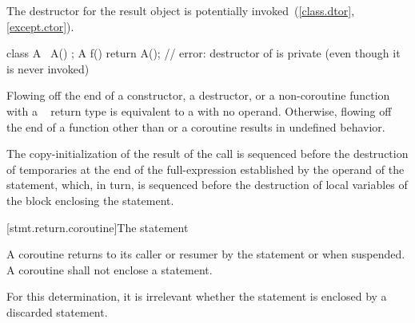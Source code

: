\pnum
The destructor for the result object
is potentially invoked~(\ref{class.dtor}, \ref{except.ctor}).
\begin{example}
\begin{codeblock}
class A {
  ~A() {}
};
A f() { return A(); }   // error: destructor of  is private (even though it is never invoked)
\end{codeblock}
\end{example}

\pnum
Flowing off the end of
a constructor,
a destructor, or
a non-coroutine function with a \cv{}~ return type is
equivalent to a  with no operand.
Otherwise, flowing off the end of a function
other than  or a coroutine
results in undefined behavior.

\pnum
The copy-initialization of the result of the call is sequenced before the
destruction of temporaries at the end of the full-expression established
by the operand of the  statement, which, in turn, is sequenced
before the destruction of local variables of the block
enclosing the  statement.

[stmt.return.coroutine]{The  statement}%
%
%

\begin{bnf}
\br
      \terminal{;}
\end{bnf}

\pnum
A coroutine returns to its caller or resumer
by the  statement or when suspended.
A coroutine shall not enclose
a  statement.
\begin{note}
For this determination, it is irrelevant whether the  statement
is enclosed by a discarded statement.
\end{note}


